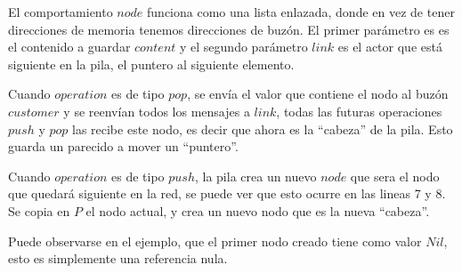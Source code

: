 El comportamiento $node$ funciona como una lista enlazada, donde en vez de tener direcciones de memoria tenemos direcciones de buzón. El primer parámetro es es el contenido a guardar $content$ y el segundo parámetro $link$ es el actor que está siguiente en la pila, el puntero al siguiente elemento.

Cuando $operation$ es de tipo $pop$, se envía el valor que contiene el nodo al buzón $customer$ y se reenvían todos los mensajes a $link$, todas las futuras operaciones $push$ y $pop$ las recibe este nodo, es decir que ahora es la ``cabeza'' de la pila. Esto guarda un parecido a mover un ``puntero''.

Cuando $operation$ es de tipo $push$, la pila crea un nuevo $node$ que sera el nodo que quedará siguiente en la red, se puede ver que esto ocurre en las lineas 7 y 8. Se copia en $P$ el nodo actual, y crea un nuevo nodo que es la nueva ``cabeza''.

Puede observarse en el ejemplo, que el primer nodo creado tiene como valor $Nil$, esto es simplemente una referencia nula. 

